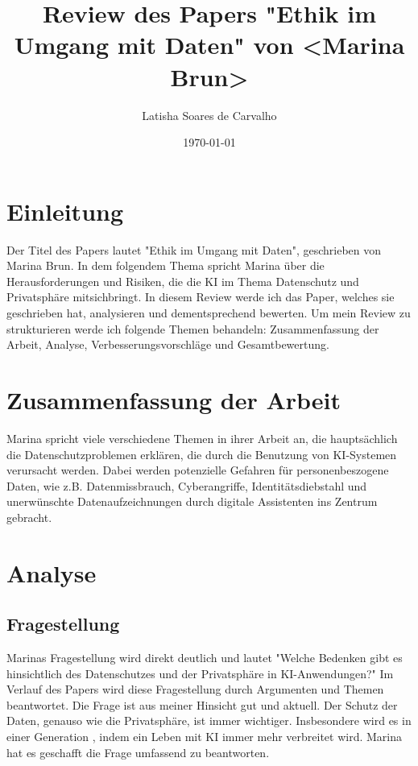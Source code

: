 \documentclass{article}
\title{Review des Papers "Ethik im Umgang mit Daten" von <Marina Brun>}
\author{Latisha Soares de Carvalho}
\date{\today}
\begin{document}
\maketitle


\tableofcontents


\section{Einleitung}
Der Titel des Papers lautet "Ethik im Umgang mit Daten", geschrieben von Marina Brun.
In dem folgendem Thema spricht Marina über die Herausforderungen und Risiken, die die KI im Thema Datenschutz und Privatsphäre mitsichbringt.
In diesem Review werde ich das Paper, welches sie geschrieben hat, analysieren und dementsprechend bewerten.
Um mein Review zu strukturieren werde ich folgende Themen behandeln: Zusammenfassung der Arbeit, Analyse, Verbesserungsvorschläge und Gesamtbewertung.

\section{Zusammenfassung der Arbeit}
Marina spricht viele verschiedene Themen in ihrer Arbeit an, die hauptsächlich die Datenschutzproblemen erklären, die durch
die Benutzung von KI-Systemen verursacht werden. Dabei werden potenzielle Gefahren für personenbeszogene Daten, wie z.B. Datenmissbrauch,
Cyberangriffe, Identitätsdiebstahl und unerwünschte Datenaufzeichnungen durch digitale Assistenten ins Zentrum gebracht.

\section{Analyse}
\subsection{Fragestellung}
Marinas Fragestellung wird direkt deutlich und lautet "Welche Bedenken gibt es hinsichtlich des Datenschutzes und der Privatsphäre
in KI-Anwendungen?" Im Verlauf des Papers wird diese Fragestellung durch Argumenten und Themen beantwortet. Die Frage ist aus meiner Hinsicht gut 
und aktuell. Der Schutz der Daten, genauso wie die Privatsphäre, ist immer wichtiger. Insbesondere wird es in einer Generation , indem ein Leben mit KI immer mehr verbreitet wird.
Marina hat es geschafft die Frage umfassend zu beantworten.
\end{document}
